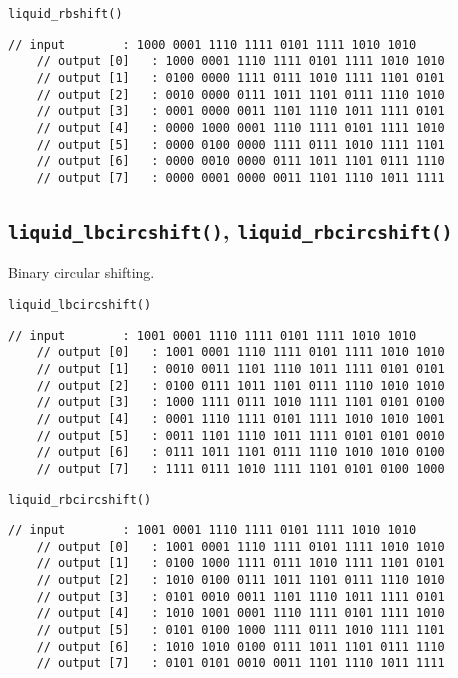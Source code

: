 {\tt liquid\_rbshift()}
\begin{Verbatim}[fontsize=\small]
    // input        : 1000 0001 1110 1111 0101 1111 1010 1010
    // output [0]   : 1000 0001 1110 1111 0101 1111 1010 1010
    // output [1]   : 0100 0000 1111 0111 1010 1111 1101 0101
    // output [2]   : 0010 0000 0111 1011 1101 0111 1110 1010
    // output [3]   : 0001 0000 0011 1101 1110 1011 1111 0101
    // output [4]   : 0000 1000 0001 1110 1111 0101 1111 1010
    // output [5]   : 0000 0100 0000 1111 0111 1010 1111 1101
    // output [6]   : 0000 0010 0000 0111 1011 1101 0111 1110
    // output [7]   : 0000 0001 0000 0011 1101 1110 1011 1111
\end{Verbatim}


\subsection{{\tt liquid\_lbcircshift()},
            {\tt liquid\_rbcircshift()}}
\label{module:utility:bcircshift}
Binary circular shifting.

{\tt liquid\_lbcircshift()}
\begin{Verbatim}[fontsize=\small]
    // input        : 1001 0001 1110 1111 0101 1111 1010 1010
    // output [0]   : 1001 0001 1110 1111 0101 1111 1010 1010
    // output [1]   : 0010 0011 1101 1110 1011 1111 0101 0101
    // output [2]   : 0100 0111 1011 1101 0111 1110 1010 1010
    // output [3]   : 1000 1111 0111 1010 1111 1101 0101 0100
    // output [4]   : 0001 1110 1111 0101 1111 1010 1010 1001
    // output [5]   : 0011 1101 1110 1011 1111 0101 0101 0010
    // output [6]   : 0111 1011 1101 0111 1110 1010 1010 0100
    // output [7]   : 1111 0111 1010 1111 1101 0101 0100 1000
\end{Verbatim}


{\tt liquid\_rbcircshift()}
\begin{Verbatim}[fontsize=\small]
    // input        : 1001 0001 1110 1111 0101 1111 1010 1010
    // output [0]   : 1001 0001 1110 1111 0101 1111 1010 1010
    // output [1]   : 0100 1000 1111 0111 1010 1111 1101 0101
    // output [2]   : 1010 0100 0111 1011 1101 0111 1110 1010
    // output [3]   : 0101 0010 0011 1101 1110 1011 1111 0101
    // output [4]   : 1010 1001 0001 1110 1111 0101 1111 1010
    // output [5]   : 0101 0100 1000 1111 0111 1010 1111 1101
    // output [6]   : 1010 1010 0100 0111 1011 1101 0111 1110
    // output [7]   : 0101 0101 0010 0011 1101 1110 1011 1111
\end{Verbatim}

